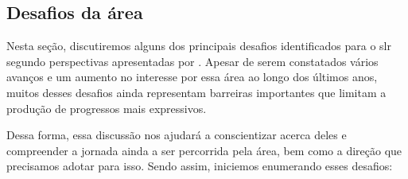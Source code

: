\subsection{Desafios da área}
\label{sec:slr-desafios}

Nesta seção, discutiremos alguns dos principais desafios identificados para o \acrfull{slr} segundo perspectivas apresentadas por .
Apesar de serem constatados vários avanços e um aumento no interesse por essa área ao longo dos últimos anos, muitos desses desafios ainda representam barreiras importantes que limitam a produção de progressos mais expressivos.

Dessa forma, essa discussão nos ajudará a conscientizar acerca deles e compreender a jornada ainda a ser percorrida pela área, bem como a direção que precisamos adotar para isso.
Sendo assim, iniciemos enumerando esses desafios:









